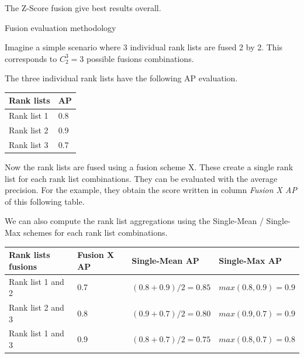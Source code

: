 The Z-Score fusion give best results overall.

\begin{example*}
  \caption{Fusion evaluation methodology}
  \label{ex:fusion_eval}

  Imagine a simple scenario where 3 individual rank lists are fused 2 by 2.
  This corresponds to $C^3_2 = 3$ possible fusions combinations.

  The three individual rank lists have the following AP evaluation.

  \vspace{0.2cm}

  \begin{center}
    \begin{tabular}{l l}
      \toprule
      Rank lists & AP \\
      \midrule
      Rank list 1 & 0.8 \\
      Rank list 2 & 0.9 \\
      Rank list 3 & 0.7 \\
      \bottomrule
    \end{tabular}
  \end{center}

  \vspace{0.5cm}

  Now the rank lists are fused using a fusion scheme X.
  These create a single rank list for each rank list combinations.
  They can be evaluated with the average precision.
  For the example, they obtain the score written in column \textit{Fusion X AP} of this following table.

  We can also compute the rank list aggregations using the Single-Mean / Single-Max schemes for each rank list combinations.

  \vspace{0.2cm}

  \begin{center}
    \begin{tabular}{l|l l l}
      \toprule
      Rank lists fusions      & Fusion X AP   & Single-Mean AP   & Single-Max AP\\
      \midrule
      Rank list 1 and 2 & 0.7 & $(0.8 + 0.9) / 2 = 0.85$ & $max(0.8, 0.9) = 0.9$\\
      Rank list 2 and 3 & 0.8 & $(0.9 + 0.7) / 2 = 0.80$ & $max(0.9, 0.7) = 0.9$\\
      Rank list 1 and 3 & 0.9 & $(0.8 + 0.7) / 2 = 0.75$ & $max(0.8, 0.7) = 0.8$\\
      \bottomrule
    \end{tabular}
  \end{center}


\end{example*}
